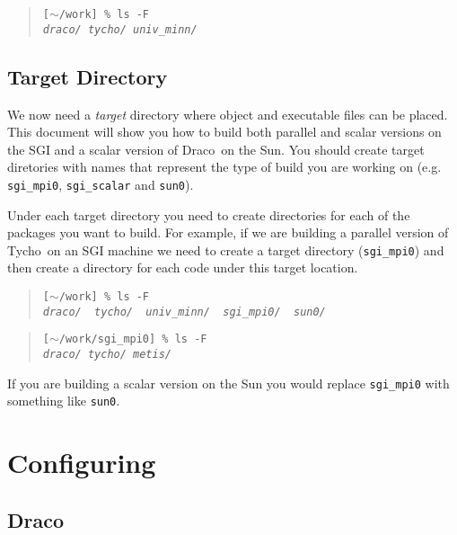 \documentclass[10pt]{nmemo}
\newcommand{\comp}[1]{\normalfont\normalsize\texttt{#1}}
\newcommand{\draco}{{\normalfont\sffamily Draco}}
\newcommand{\tycho}{{\normalfont\sffamily Tycho}}
\begin{document}
\footnotesize
\begin{verse}
\texttt{[$\sim$/work] \% ls -F \\
\emph{draco/  tycho/  univ\_minn/}}
\end{verse}
\normalsize

\subsection{Target Directory}

We now need a \emph{target} directory where object and executable
files can be placed.  This document will show you how to build both
parallel and scalar versions on the SGI and a scalar version of
\draco\ on the Sun.  You should create target diretories with names
that represent the type of build you are working on
(e.g. \comp{sgi\_mpi0}, \comp{sgi\_scalar} and \comp{sun0}).

Under each target directory you need to create directories for each of
the packages you want to build.  For example, if we are building a
parallel version of \tycho\ on an SGI machine we need to create a
target directory (\comp{sgi\_mpi0}) and then create a directory for
each code under this target location.

\footnotesize
\begin{verse}
\texttt{[$\sim$/work] \% ls -F \\
\emph{draco/\ \ tycho/\ \ univ\_minn/\ \ sgi\_mpi0/\ \ sun0/ }}
\end{verse}

\begin{verse}
\texttt{[$\sim$/work/sgi\_mpi0] \% ls -F \\
\emph{draco/  tycho/  metis/}}
\end{verse}
\normalsize

If you are building a scalar version on the Sun you would replace
\comp{sgi\_mpi0} with something like \comp{sun0}.


\section{Configuring}
\label{configure}

\subsection{\draco}
\end{document}
